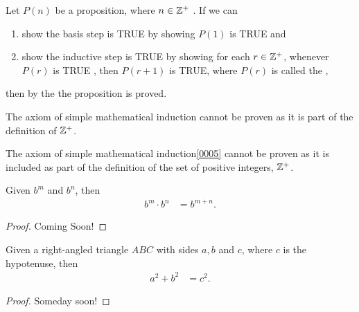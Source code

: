 \begin{axiom}
\label{0005}
Let \(P(n)\) be a proposition, where \( n \in \mathbb{Z}^{+} \) .  If we can
\begin{enumerate}
    \item show the basis step is TRUE by showing \(P(1)\) is TRUE and 
    \item show the inductive step is TRUE by showing for each 
    \( r \in \mathbb{Z}^{+} \), whenever \( P(r) \) is TRUE , then \( P(r + 1) \) is
    TRUE, where \( P(r) \) is called the , 
\end{enumerate}
then by the  the proposition is proved.
        
The axiom of simple mathematical induction cannot be proven as it is part of the definition of \(\mathbb{Z}^{+}\).
        
\end{axiom}

The axiom of simple mathematical induction\ref{0005} cannot be proven as it is 
included as part of the definition of the set of positive integers, 
\( \mathbb{Z}^{+} \).

\begin{proposition}
\label{0003}
Given \( b^m \) and \( b^n \), then
\begin{align*}
    b^m \cdot b^n &= b^{m + n}.
\end{align*}
\end{proposition}
\begin{proof}
    Coming Soon!
\end{proof}

\begin{theorem}
    \label{0004}
    Given a right-angled triangle \( ABC \) with sides \( a, b \) and \( c \),
    where \( c \) is the hypotenuse, then
    \begin{align*}
        a^2 + b^2 &= c^2.
    \end{align*}
    \end{theorem}
    \begin{proof}
        Someday soon!
    \end{proof}

